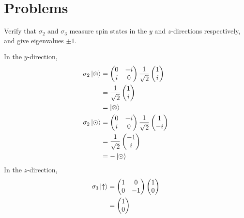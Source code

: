 \documentclass[12pt]{book} %
\numberwithin{equation}{chapter}
\def\s{\sigma}
\begin{document}
\section*{Problems}
\begin{problem}
\label{Problem 6.1}
Verify that $\s_{2}$ and $\s_{3}$ measure spin states in the $y$ and $z$-directions respectively, and give eigenvalues $\pm1$.
\end{problem}

\begin{solbox}
In the $y$-direction,
\begin{align*}
\s_{2}\ket{\otimes}&=
\begin{pmatrix}
0&-i\\
i&0
\end{pmatrix}
\frac{1}{\sqrt{2}}
\begin{pmatrix}
1\\
i
\end{pmatrix}\\
&=\frac{1}{\sqrt{2}}
\begin{pmatrix}
1\\
i
\end{pmatrix}\\
&=\ket{\otimes}\\
\s_{2}\ket{\odot}&=
\begin{pmatrix}
0&-i\\
i&0
\end{pmatrix}
\frac{1}{\sqrt{2}}
\begin{pmatrix}
1\\
-i
\end{pmatrix}\\
&=\frac{1}{\sqrt{2}}
\begin{pmatrix}
-1\\
i
\end{pmatrix}\\
&=-\ket{\odot}
\end{align*}
In the $z$-direction,
\begin{align*}
\s_{3}\ket{\uparrow}&=
\begin{pmatrix}
1&0\\
0&-1
\end{pmatrix}
\begin{pmatrix}
1\\
0
\end{pmatrix}\\
&=
\begin{pmatrix}
1\\
0
\end{pmatrix}\\

\end{align*}
\end{solbox}
\end{document}

